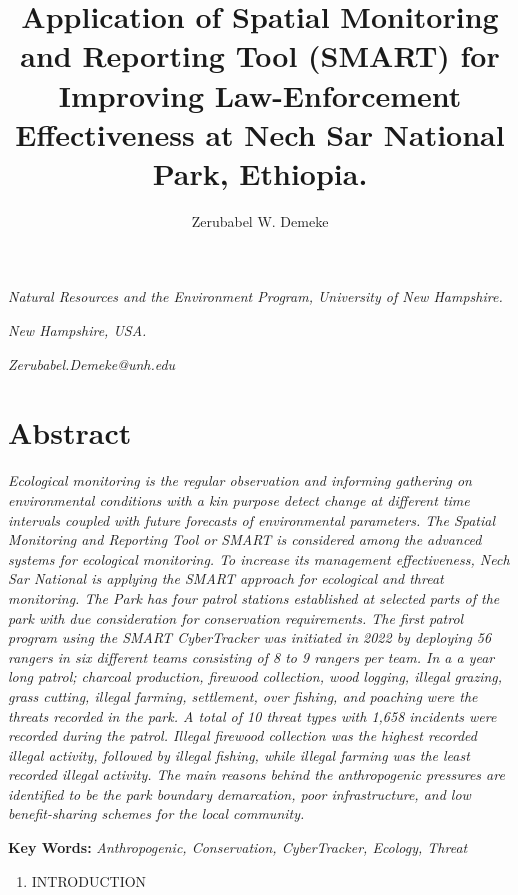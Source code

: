 \documentclass[
  letterpaper,
  DIV=11,
  numbers=noendperiod]{scrartcl}
\title{Application of Spatial Monitoring and Reporting Tool (SMART) for
Improving Law-Enforcement Effectiveness at Nech Sar National Park,
Ethiopia.}
\author{Zerubabel W. Demeke}
\date{}
\providecommand{\tightlist}{%
  \setlength{\itemsep}{0pt}\setlength{\parskip}{0pt}}\usepackage{longtable,booktabs,array}
\begin{document}
\maketitle


\emph{Natural Resources and the Environment Program, University of New
Hampshire.}

\emph{New Hampshire, USA.}

\emph{Zerubabel.Demeke@unh.edu}

\section{\texorpdfstring{\textbf{Abstract}}{Abstract}}\label{abstract}

\emph{Ecological monitoring is the regular observation and informing
gathering on environmental conditions with a kin purpose detect change
at different time intervals coupled with future forecasts of
environmental parameters. The Spatial Monitoring and Reporting Tool or
SMART is considered among the advanced systems for ecological
monitoring. To increase its management effectiveness, Nech Sar National
is applying the SMART approach for ecological and threat monitoring. The
Park has four patrol stations established at selected parts of the park
with due consideration for conservation requirements. The first patrol
program using the SMART CyberTracker was initiated in 2022 by deploying
56 rangers in six different teams consisting of 8 to 9 rangers per team.
In a a year long patrol; charcoal production, firewood collection, wood
logging, illegal grazing, grass cutting, illegal farming, settlement,
over fishing, and poaching were the threats recorded in the park. A
total of 10 threat types with 1,658 incidents were recorded during the
patrol. Illegal firewood collection was the highest recorded illegal
activity, followed by illegal fishing, while illegal farming was the
least recorded illegal activity. The main reasons behind the
anthropogenic pressures are identified to be the park boundary
demarcation, poor infrastructure, and low benefit-sharing schemes for
the local community.}

\textbf{Key Words:} \emph{Anthropogenic, Conservation, CyberTracker,
Ecology, Threat}

\begin{enumerate}
\def\labelenumi{\arabic{enumi}.}
\tightlist
\item
  INTRODUCTION
\end{enumerate}
\end{document}
